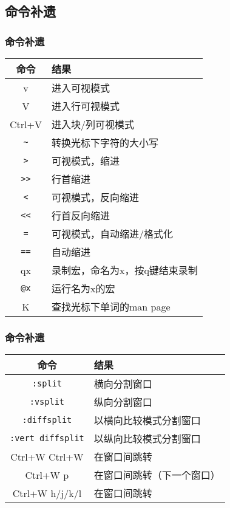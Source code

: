 \subsection{命令补遗}
\begin{frame}[fragile]
  \frametitle{命令补遗}
  \begin{table}
    \centering
    \begin{tabularx}{0.7\textwidth}{cX}
      \hline
      \rowcolor{blue!50}命令 & 结果\\
      \hline
      v & 进入可视模式\\
      V & 进入行可视模式\\
      Ctrl+V & 进入块/列可视模式\\
      \hline
      \verb|~| & 转换光标下字符的大小写\\
      \hline
      \verb|>| & 可视模式，缩进\\
      \verb|>>| & 行首缩进\\
      \verb|<| & 可视模式，反向缩进\\
      \verb|<<| & 行首反向缩进\\
      \verb|=| & 可视模式，自动缩进/格式化\\
      \verb|==| & 自动缩进\\
      \hline
      qx & 录制宏，命名为x，按q键结束录制\\
      \verb|@x| & 运行名为x的宏\\
      \hline
      K & 查找光标下单词的man page\\
      \hline
    \end{tabularx}
  \end{table}
\end{frame}

\begin{frame}[fragile]
  \frametitle{命令补遗}
  \begin{table}
    \centering
    \begin{tabularx}{0.8\textwidth}{cX}
      \hline
      \rowcolor{blue!50}命令 & 结果\\
      \hline
      \verb|:split| & 横向分割窗口\\
      \verb|:vsplit| & 纵向分割窗口\\
      \verb|:diffsplit| & 以横向比较模式分割窗口\\
      \verb|:vert diffsplit| & 以纵向比较模式分割窗口\\
      Ctrl+W Ctrl+W & 在窗口间跳转\\
      Ctrl+W p & 在窗口间跳转（下一个窗口）\\
      Ctrl+W h/j/k/l & 在窗口间跳转\\
      \hline
    \end{tabularx}
  \end{table}
\end{frame}

